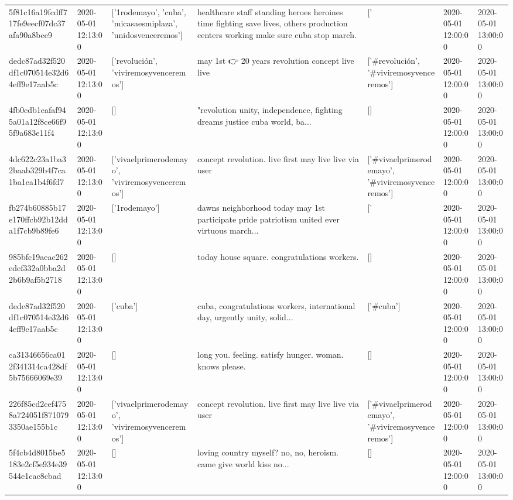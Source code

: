 \begin{tabular}{lllllll}
5f81c16a19fcdff717fe9eecf07dc37afa90a8bee9 & 2020-05-01 12:13:00 & ['1rodemayo', 'cuba', 'micasaesmiplaza', 'unidosvenceremos'] & healthcare staff standing heroes heroines time fighting save lives, others production centers working make sure cuba stop march. & ['#1rodemayo', '#cuba', '#micasaesmiplaza', '#unidosvenceremos'] & 2020-05-01 12:00:00 & 2020-05-01 13:00:00 \\
dedc87ad32f520df1c070514e32d64eff9e17aab5c & 2020-05-01 12:13:00 & ['revolución', 'viviremosyvenceremos'] & may 1st 👉 20 years revolution concept live live & ['#revolución', '#viviremosyvenceremos'] & 2020-05-01 12:00:00 & 2020-05-01 13:00:00 \\
4fb0cdb1eafaf945a01a12f8ce66f95f9a683e11f4 & 2020-05-01 12:13:00 & [] & "revolution unity, independence, fighting dreams justice cuba world, ba... & [] & 2020-05-01 12:00:00 & 2020-05-01 13:00:00 \\
4dc622c23a1ba32baab329b4f7ca1ba1ea1b4f6fd7 & 2020-05-01 12:13:00 & ['vivaelprimerodemayo', 'viviremosyvenceremos'] & concept revolution. live first may live live via user & ['#vivaelprimerodemayo', '#viviremosyvenceremos'] & 2020-05-01 12:00:00 & 2020-05-01 13:00:00 \\
fb274b60885b17e170ffcb92b12dda1f7cb9b89fe6 & 2020-05-01 12:13:00 & ['1rodemayo'] & dawns neighborhood today may 1st participate pride patriotism united ever virtuous march... & ['#1rodemayo'] & 2020-05-01 12:00:00 & 2020-05-01 13:00:00 \\
985bfc19aeac262edef332a0bba2d2b6b9af5b2718 & 2020-05-01 12:13:00 & [] & today house square. congratulations workers. & [] & 2020-05-01 12:00:00 & 2020-05-01 13:00:00 \\
dedc87ad32f520df1c070514e32d64eff9e17aab5c & 2020-05-01 12:13:00 & ['cuba'] & cuba, congratulations workers, international day, urgently unity, solid... & ['#cuba'] & 2020-05-01 12:00:00 & 2020-05-01 13:00:00 \\
ca31346656ca012f341314ca428df5b75666069e39 & 2020-05-01 12:13:00 & [] & long you. feeling. satisfy hunger. woman. knows please. & [] & 2020-05-01 12:00:00 & 2020-05-01 13:00:00 \\
226f85cd2cef4758a724051f8710793350ae155b1c & 2020-05-01 12:13:00 & ['vivaelprimerodemayo', 'viviremosyvenceremos'] & concept revolution. live first may live live via user & ['#vivaelprimerodemayo', '#viviremosyvenceremos'] & 2020-05-01 12:00:00 & 2020-05-01 13:00:00 \\
5f4cb4d8015be5183e2cf5e934e39544e1cac8cbad & 2020-05-01 12:13:00 & [] & loving country myself? no, no, heroism. came give world kiss no... & [] & 2020-05-01 12:00:00 & 2020-05-01 13:00:00 \\

\end{tabular}
